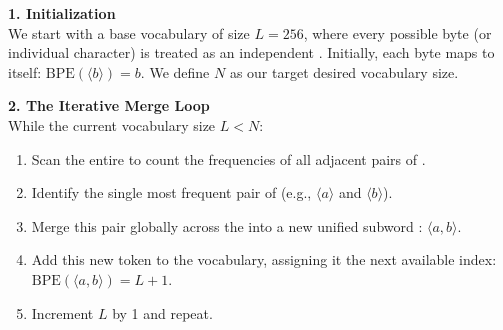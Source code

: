 
\textbf{1. Initialization} \\
We start with a base vocabulary of size $L = 256$, where every possible byte (or individual character) is treated as an independent . Initially, each byte maps to itself: $\text{BPE}(\langle b \rangle) = b$. We define $N$ as our target desired vocabulary size.

\textbf{2. The Iterative Merge Loop} \\
While the current vocabulary size $L < N$:
\begin{enumerate}
    \item Scan the entire  to count the frequencies of all adjacent pairs of .
    \item Identify the single most frequent pair of  (e.g., $\langle a \rangle$ and $\langle b \rangle$).
    \item Merge this pair globally across the  into a new unified subword : $\langle a, b \rangle$.
    \item Add this new token to the vocabulary, assigning it the next available index: $\text{BPE}(\langle a, b \rangle) = L + 1$.
    \item Increment $L$ by 1 and repeat.
\end{enumerate}


